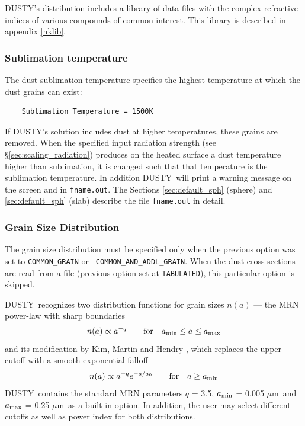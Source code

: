 \documentclass[11pt]{article}
\def\D    {{\sf DUSTY}}
\def\eq#1{\begin{equation} #1 \end{equation}}
\def\mic    {\hbox{$\mu$m}}
\begin{document}
\D's distribution includes a library of data files with the complex
refractive indices of various compounds of common interest. This
library is described in appendix \ref{nklib}.

\subsubsection{Sublimation temperature}
\label{sec:sub_temp}

The dust sublimation temperature specifies the highest temperature at
which the dust grains can exist:
\begin{verbatim}
    Sublimation Temperature = 1500K
\end{verbatim}
If \D's solution includes dust at higher temperatures, these grains
are removed. When the specified input radiation strength (see
\S\ref{sec:scaling_radiation}) produces on the heated surface a dust
temperature higher than sublimation, it is changed such that that
temperature is the sublimation temperature. In addition \D\ will print
a warning message on the screen and in {\tt fname.out}. The Sections
\ref{sec:default_sph} (sphere) and \ref{sec:default_sph} (slab)
describe the file {\tt fname.out} in detail.

\subsubsection{Grain Size Distribution}

The grain size distribution must be specified only when the previous
option was set to {\tt COMMON\_GRAIN} or {\tt
  COMMON\_AND\_ADDL\_GRAIN}.  When the dust cross sections are read
from a file (previous option set at {\tt TABULATED}), this particular
option is skipped.

\D\ recognizes two distribution functions for grain sizes $n(a)$ ---
the MRN \cite{MRN77} power-law with sharp boundaries \eq{ n(a) \propto
  a^{-q} \qquad \hbox{for} \quad a_{\rm min} \le a \le a_{\rm max} }
and its modification by Kim, Martin and Hendry \cite{KMH94}, which
replaces the upper cutoff with a smooth exponential falloff \eq{ n(a)
  \propto a^{-q} e^{-a/a_0} \qquad \hbox{for} \quad a \ge a_{\rm min}}
\D\ contains the standard MRN parameters $q$ = 3.5, $a_{\rm min}$ =
0.005 \mic\ and $a_{\rm max}$ = 0.25 \mic\ as a built-in option.  In
addition, the user may select different cutoffs as well as power index
for both distributions.
\end{document}
